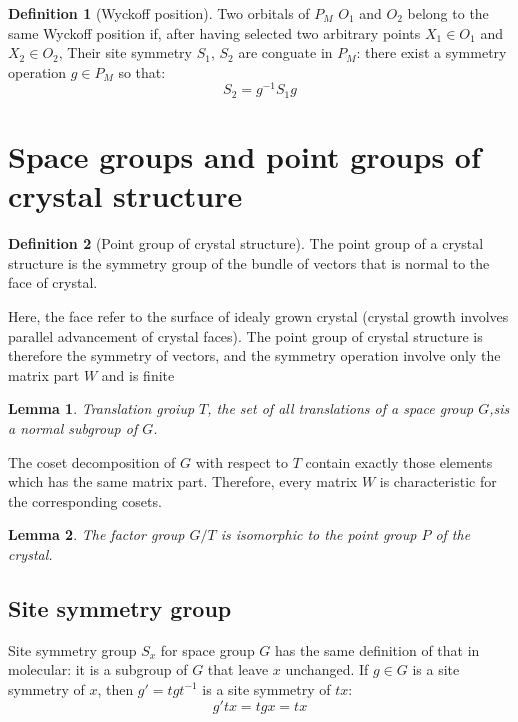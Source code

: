 \documentclass{amsart}
\newtheorem*{lemma}{Lemma}
\theoremstyle{remark}
\theoremstyle{remark}
\theoremstyle{definition}
\newtheorem*{definition}{Definition}
\begin{document}
\begin{definition}
    [Wyckoff position]
    Two orbitals of $P_M$ $O_1$ and $O_2$ belong to the same Wyckoff position if, after having selected two arbitrary points $X_1 \in O_1$ 
    and $X_2 \in O_2$, Their site symmetry $S_1$, $S_2$ are conguate in $P_M$: there exist a symmetry operation $g \in P_M$ so that:
    \[S_2 = g^{-1}S_1 g\]
\end{definition}

\vspace{10pt}
\section*{Space groups and point groups of crystal structure}

\begin{definition}
    [Point group of crystal structure]
    The point group of a crystal structure is the symmetry group of the bundle of vectors that is normal to the face of crystal.
\end{definition}
Here, the face refer to the surface of idealy grown crystal (crystal growth involves parallel advancement of crystal faces). 
The point group of crystal structure is therefore the symmetry of vectors, and the symmetry operation involve only 
the matrix part $W$ and is finite

\begin{lemma}
    Translation groiup $T$, the set of all translations of a space group $G$,sis a normal subgroup of $G$.
\end{lemma}
The coset decomposition of $G$ with respect to $T$ contain exactly those elements which has the same matrix part. 
Therefore, every matrix $W$ is characteristic for the corresponding cosets. 

\begin{lemma}
    The factor group $G/T$ is isomorphic to the point group $P$ of the crystal.
\end{lemma}

\vspace{10pt}
\subsection*{Site symmetry group}
Site symmetry group $S_x$ for space group $G$ has the same definition of that in molecular: it is 
a subgroup of $G$ that leave $x$ unchanged. 
If $g\in G$ is a site symmetry of $x$, then $g' = tgt^{-1}$ is a site symmetry of $tx$:
\begin{equation*}
    g'tx = tgx = tx
\end{equation*}
\end{document}
